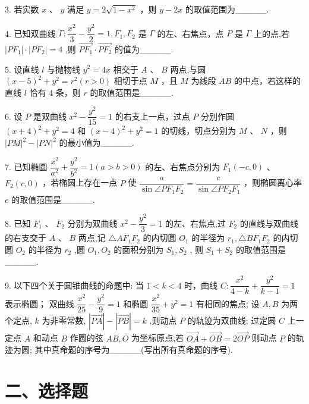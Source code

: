 3. 若实数 $x$ 、 $y$ 满足 $y = 2\sqrt{1 - {x}^{2}}$ ，则 $y - {2x}$ 的取值范围为\_\_\_\_\_.

4. 已知双曲线 $\Gamma  : \dfrac{{x}^{2}}{3} - \dfrac{{y}^{2}}{2} = 1,{F}_{1},{F}_{2}$ 是 $\Gamma$ 的左、右焦点，点 $P$ 是 $\Gamma$ 上的点,若 $\left| {P{F}_{1}}\right|  \cdot  \left| {P{F}_{2}}\right|  = 4$ ,则 $\overrightarrow{P{F}_{1}} \cdot  \overrightarrow{P{F}_{2}}$ 的值为\_\_\_\_\_.

5. 设直线 $l$ 与抛物线 ${y}^{2} = {4x}$ 相交于 $A$ 、 $B$ 两点,与圆 ${\left( x - 5\right) }^{2} + {y}^{2} = {r}^{2}\left( {r > 0}\right)$ 相切于点 $M$ ，且 $M$ 为线段 ${AB}$ 的中点，若这样的直线 $l$ 恰有 4 条，则 $r$ 的取值范围是\_\_\_\_\_.

6. 设 $P$ 是双曲线 ${x}^{2} - \dfrac{{y}^{2}}{15} = 1$ 的右支上一点，过点 $P$ 分别作圆 ${\left( x + 4\right) }^{2} + {y}^{2} = 4$ 和 ${\left( x - 4\right) }^{2} + {y}^{2} = 1$ 的切线，切点分别为 $M$ 、 $N$ ，则 ${\left| PM\right| }^{2} - {\left| PN\right| }^{2}$ 的最小值为\_\_\_\_\_.

7. 已知椭圆 $\dfrac{{x}^{2}}{{a}^{2}} + \dfrac{{y}^{2}}{{b}^{2}} = 1\left( {a > b > 0}\right)$ 的左、右焦点分别为 ${F}_{1}\left( {-c,0}\right)$ 、 ${F}_{2}\left( {c,0}\right)$ ，若椭圆上存在一点 $P$ 使 $\dfrac{a}{\sin \angle P{F}_{1}{F}_{2}} = \dfrac{c}{\sin \angle P{F}_{2}{F}_{1}}$ ，则椭圆离心率 $e$ 的取值范围是\_\_\_\_\_.

8. 已知 ${F}_{1}$ 、 ${F}_{2}$ 分别为双曲线 ${x}^{2} - \dfrac{{y}^{2}}{3} = 1$ 的左、右焦点,过 ${F}_{2}$ 的直线与双曲线的右支交于 $A$ 、 $B$ 两点,记 $\bigtriangleup A{F}_{1}{F}_{2}$ 的内切圆 ${O}_{1}$ 的半径为 ${r}_{1},\bigtriangleup B{F}_{1}{F}_{2}$ 的内切圆 ${O}_{2}$ 的半径为 ${r}_{2}$ ,圆 ${O}_{1},{O}_{2}$ 的面积分别为 ${S}_{1},{S}_{2}$ , 则 ${S}_{1} + {S}_{2}$ 的取值范围是\_\_\_\_\_.

9. 以下四个关于圆锥曲线的命题中:   当 $1 < k < 4$ 时，曲线 $C : \dfrac{{x}^{2}}{4 - k} + \dfrac{{y}^{2}}{k - 1} = 1$ 表示椭圆；   双曲线 $\dfrac{{x}^{2}}{25} -  \dfrac{{y}^{2}}{9} = 1$ 和椭圆 $\dfrac{{x}^{2}}{35} + {y}^{2} = 1$ 有相同的焦点;   设 $A,B$ 为两个定点, $k$ 为非零常数, $\left| \overrightarrow{PA}\right|  - \left| \overrightarrow{PB}\right|  = k$ ,则动点 $P$ 的轨迹为双曲线;   过定圆 $C$ 上一定点 $A$ 和动点 $B$ 作圆的弦 ${AB},O$ 为坐标原点,若 $\overrightarrow{OA} + \overrightarrow{OB} = 2\overrightarrow{OP}$ 则动点 $P$ 的轨迹为圆; 其中真命题的序号为\_\_\_\_\_(写出所有真命题的序号).

\section*{二、选择题}


